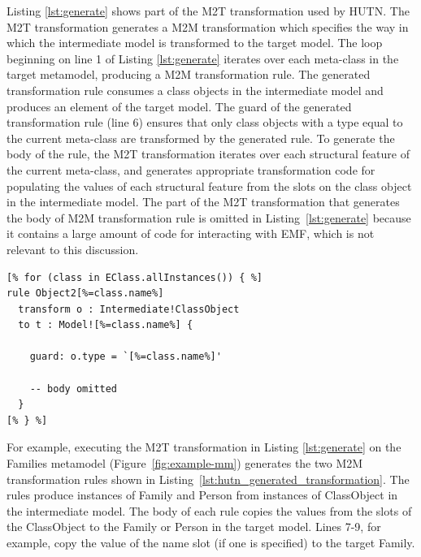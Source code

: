 Listing \ref{lst:generate} shows part of the M2T transformation used by HUTN. The M2T transformation generates a M2M transformation which specifies the way in which the intermediate model is transformed to the target model. The loop beginning on line 1 of Listing \ref{lst:generate} iterates over each meta-class in the target metamodel, producing a M2M transformation rule. The generated transformation rule consumes a class objects in the intermediate model and produces an element of the target model. The guard of the generated transformation rule (line 6) ensures that only class objects with a type equal to the current meta-class are transformed by the generated rule. To generate the body of the rule, the M2T transformation iterates over each structural feature of the current meta-class, and generates appropriate transformation code for populating the values of each structural feature from the slots on the class object in the intermediate model. The part of the M2T transformation that generates the body of M2M transformation rule is omitted in Listing~\ref{lst:generate} because it contains a large amount of code for interacting with EMF, which is not relevant to this discussion.

\begin{lstlisting}[caption=Part of the M2T transformation (in EGL) for generating the intermediate model to target model transformation (in ETL)., label=lst:generate, language=EGL]
[% for (class in EClass.allInstances()) { %]
rule Object2[%=class.name%]
  transform o : Intermediate!ClassObject
  to t : Model![%=class.name%] {

    guard: o.type = `[%=class.name%]'

    -- body omitted
  }
[% } %]
\end{lstlisting}

For example, executing the M2T transformation in Listing \ref{lst:generate} on the Families metamodel (Figure~\ref{fig:example-mm}) generates the two M2M transformation rules shown in Listing~\ref{lst:hutn_generated_transformation}. The rules produce instances of Family and Person from instances of ClassObject in the intermediate model. The body of each rule copies the values from the slots of the ClassObject to the Family or Person in the target model. Lines 7-9, for example, copy the value of the name slot (if one is specified) to the target Family.

